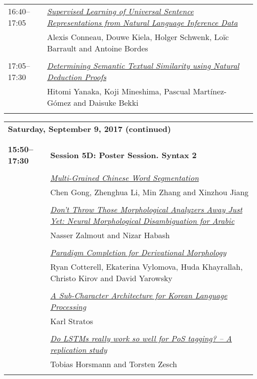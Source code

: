 \begin{tabular}{p{20mm}p{128mm}}
16:40--17:05 & \hyperlink{page.679}{\em Supervised Learning of Universal Sentence Representations from Natural Language Inference Data}\\
         & Alexis Conneau, Douwe Kiela, Holger Schwenk, Lo\"{i}c Barrault and Antoine Bordes \\
\\

17:05--17:30 & \hyperlink{page.690}{\em Determining Semantic Textual Similarity using Natural Deduction Proofs}\\
         & Hitomi Yanaka, Koji Mineshima, Pascual Mart\'{i}nez-G\'{o}mez and Daisuke Bekki \\
\\

\end{tabular}
\newpage
\begin{tabular}{p{20mm}p{128mm}}
\\
\multicolumn{2}{l}{\bf Saturday, September 9, 2017 (continued)} \\\\
\\{\bf 15:50--17:30} & {\bf Session 5D: Poster Session. Syntax 2 } \\
\\
 & \hyperlink{page.701}{\em Multi-Grained Chinese Word Segmentation}\\
         & Chen Gong, Zhenghua Li, Min Zhang and Xinzhou Jiang \\
\\

 & \hyperlink{page.713}{\em Don't Throw Those Morphological Analyzers Away Just Yet: Neural Morphological Disambiguation for Arabic}\\
         & Nasser Zalmout and Nizar Habash \\
\\

 & \hyperlink{page.723}{\em Paradigm Completion for Derivational Morphology}\\
         & Ryan Cotterell, Ekaterina Vylomova, Huda Khayrallah, Christo Kirov and David Yarowsky \\
\\

 & \hyperlink{page.730}{\em A Sub-Character Architecture for Korean Language Processing}\\
         & Karl Stratos \\
\\

 & \hyperlink{page.736}{\em Do LSTMs really work so well for PoS tagging? -- A replication study}\\
         & Tobias Horsmann and Torsten Zesch \\
\\


\end{tabular}
